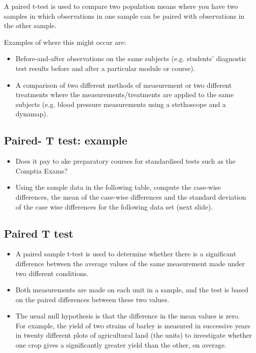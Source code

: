 \documentclass[a4paper,12pt]{article}
\begin{document}
{
A paired t-test is used to compare two population means where you have two samples in
which observations in one sample can be paired with observations in the other sample.\\
\bigskip


Examples of where this might occur are:

\begin{itemize}
\item  Before-and-after observations on the same subjects (e.g. students’ diagnostic test
results before and after a particular module or course).
\item A comparison of two different methods of measurement or two different treatments
where the measurements/treatments are applied to the same subjects (e.g. blood
pressure measurements using a stethoscope and a dynamap).
\end{itemize}
}


\subsection*{Paired- T  test: example}
\begin{itemize}
\item Does it pay to ake preparatory courses for standardised tests such as the Comptia Exams?
\item Using the sample data in the following table, compute the case-wise differences, the mean of the case-wise differences and the standard deviation of the case wise differences for the following data set (next slide).
\end{itemize}
\medskip

\subsection*{Paired T test}
\begin{itemize} \item A paired sample t-test is used to determine whether there is a significant difference between the average values of the same measurement made under two different conditions. \item Both measurements are made on each unit in a sample, and the test is based on the paired differences between these two values. \item The usual null hypothesis is that the difference in the mean values is zero. For example, the yield of two strains of barley is measured in successive years in twenty different plots of agricultural land (the units) to investigate whether one crop gives a significantly greater yield than the other, on average.
\end{itemize}
\end{document}
